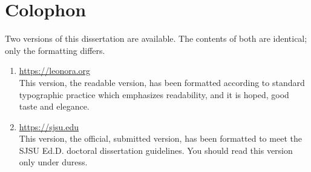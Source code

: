 \chapter{Colophon}
\small\OnehalfSpacing%

Two versions of this dissertation are available. The contents of both are identical; only the formatting differs.
\begin{enumerate}[nosep]
  \item \url{https://leonora.org}\\\noindent%
  This version, the readable version, has been formatted according to standard typographic practice which emphasizes  readability, and it is hoped, good taste and elegance. 
  \item \url{https://sjsu.edu}\\\noindent%
  This version, the official, submitted version, has been formatted to meet the SJSU Ed.D. doctoral dissertation guidelines. You should read this version only under duress.
\end{enumerate}


